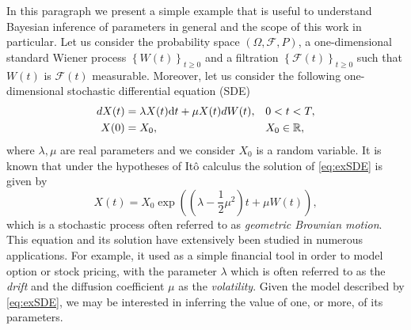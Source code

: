 In this paragraph we present a simple example that is useful to understand Bayesian inference of parameters in general and the scope of this work in particular. Let us consider the probability space $(\Omega, \mathcal{F}, P)$, a one-dimensional standard Wiener process $\left\{W(t)\right\}_{t\geq 0}$ and a filtration $\left\{\mathcal{F}(t)\right\}_{t\geq 0}$ such that $W(t)$ is $\mathcal{F}(t)$ measurable. Moreover, let us consider the following one-dimensional stochastic differential equation (SDE)
\begin{equation}\label{eq:exSDE}
\begin{aligned}
	dX(t) &= \lambda X(t) \dd t + \mu X(t) dW(t), && 0 < t < T, \\
	X(0) &= X_0, && X_0 \in \mathbb{R},
\end{aligned}
\end{equation}
where $\lambda, \mu$ are real parameters and we consider $X_0$ is a random variable. It is known that under the hypotheses of It\^o calculus the solution of \eqref{eq:exSDE} is given by
\begin{equation}
	X(t) = X_0 \exp\left(\left(\lambda - \frac{1}{2}\mu^2\right)t + \mu W(t)\right),
\end{equation}
which is a stochastic process often referred to as \textit{geometric Brownian motion}. This equation and its solution have extensively been studied  in numerous applications. For example, it used as a simple financial tool in order to model option or stock pricing, with the parameter $\lambda$ which is often referred to as the \textit{drift} and the diffusion coefficient $\mu$ as the \textit{volatility}. Given the model described by \eqref{eq:exSDE}, we may be interested in inferring the value of one, or more, of its parameters. 

